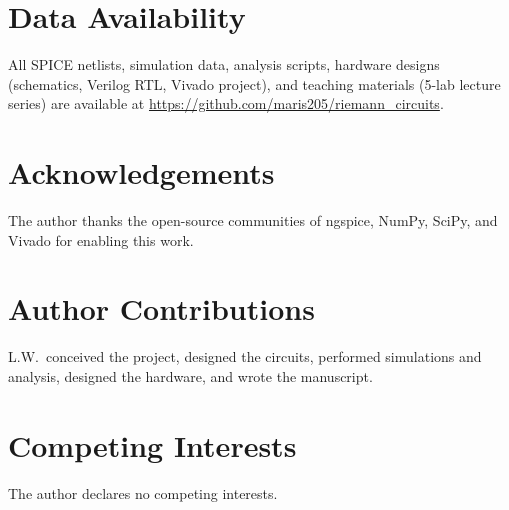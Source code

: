 \documentclass[11pt]{article}
\begin{document}
\section*{Data Availability}

All SPICE netlists, simulation data, analysis scripts, hardware designs (schematics, Verilog RTL, Vivado project), and teaching materials (5-lab lecture series) are available at \url{https://github.com/maris205/riemann_circuits}.

\section*{Acknowledgements}

The author thanks the open-source communities of ngspice, NumPy, SciPy, and Vivado for enabling this work.

\section*{Author Contributions}

L.W.\ conceived the project, designed the circuits, performed simulations and analysis, designed the hardware, and wrote the manuscript.

\section*{Competing Interests}

The author declares no competing interests.
\end{document}
